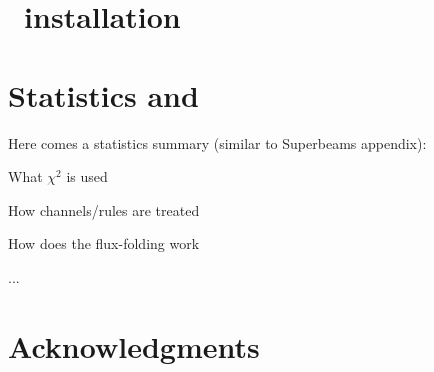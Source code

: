 
\begin{appendix}

\chapter{\GLOBES\ installation}

\chapter{Statistics and \GLOBES }

Here comes a statistics summary (similar to Superbeams appendix):
\bi
\item
 What $\chi^2$ is used
\item
 How channels/rules are treated
\item
 How does the flux-folding work
\item
 ...
\ei





\chapter*{Acknowledgments}

\end{appendix}

